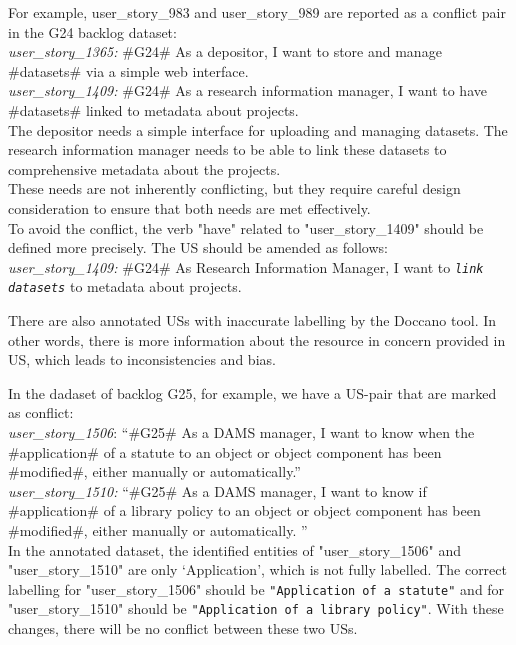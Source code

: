 \begin{example}
	For example, user\_story\_983 and user\_story\_989 are reported as a conflict pair in the G24 backlog dataset:\\
	\textit{user\_story\_1365:} \#G24\# As a depositor, I want to store and manage \#datasets\# via a simple web interface.\\
	\textit{user\_story\_1409:} \#G24\# As a research information manager, I want to have \#datasets\# linked to metadata about projects.\\
	The depositor needs a simple interface for uploading and managing datasets. The research information manager needs to be able to link these datasets to comprehensive metadata about the projects.\\
	These needs are not inherently conflicting, but they require careful design consideration to ensure that both needs are met effectively.\\
	To avoid the conflict, the verb "have" related to "user\_story\_1409" should be defined more precisely. The US should be amended as follows:\\
	\textit{user\_story\_1409:} \#G24\# As Research Information Manager, I want to \textit{\texttt{link} \texttt{datasets}} to metadata about projects.\\
\end{example}

There are also annotated USs with inaccurate labelling by the Doccano tool. In other words, there is more information about the resource in concern provided in US, which leads to inconsistencies and bias.
\begin{example}
	In the dadaset of backlog G25, for example, we have a US-pair that are marked as conflict:\\
	\textit{user\_story\_1506}: \enquote{\#G25\# As a DAMS manager, I want to know when the \#application\# of a statute to an object or object component has been \#modified\#, either manually or automatically.}\\
	\textit{user\_story\_1510:} \enquote{\#G25\# As a DAMS manager, I want to know if \#application\# of a library policy to an object or object component has been \#modified\#, either manually or automatically.
	}\\
	In the annotated dataset, the identified entities of "user\_story\_1506" and "user\_story\_1510" are only ‘Application’, which is not fully labelled. The correct labelling for "user\_story\_1506" should be \texttt{"Application of a statute"} and for "user\_story\_1510" should be \texttt{"Application of a library policy"}. With these changes, there will be no conflict between these two USs.	
\end{example}
